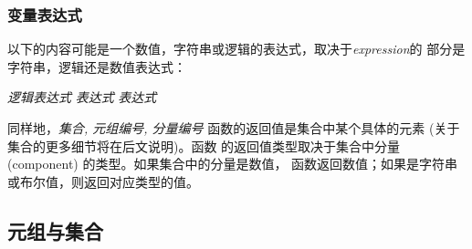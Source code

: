\subsubsection{变量表达式}
以下的内容可能是一个数值，字符串或逻辑的表达式，取决于\emph{expression}的
部分是字符串，逻辑还是数值表达式：

\smallskip
{} \emph{逻辑表达式} 
\emph{表达式}  \emph{表达式} 

\smallskip

\noindent 同样地，\emph{集合, 元组编号, 分量编号}\code{)}
函数的返回值是集合中某个具体的元素 (关于集合的更多细节将在后文说明)。函数
的返回值类型取决于集合中分量 (component) 的类型。如果集合中的分量是数值，
函数返回数值；如果是字符串或布尔值，则返回对应类型的值。

\subsection{元组与集合}

